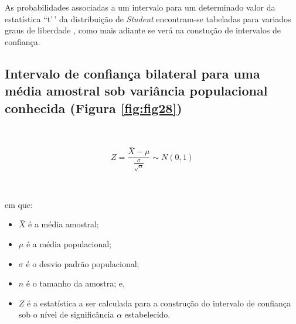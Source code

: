 \documentclass[
]{book}
\providecommand{\tightlist}{%
  \setlength{\itemsep}{0pt}\setlength{\parskip}{0pt}}
\begin{document}
\hfill\break

As probabilidades associadas a um intervalo para um determinado valor da estatística ``t'\,' da distribuição de \emph{Student} encontram-se tabeladas para variados graus de liberdade , como mais adiante se verá na constução de intervalos de confiança.

\hfill\break

\hypertarget{intervalo-de-confianuxe7a-bilateral-para-uma-muxe9dia-amostral-sob-variuxe2ncia-populacional-conhecida-figura-reffigfig28}{%
\subsection{Intervalo de confiança bilateral para uma média amostral sob variância populacional conhecida (Figura \ref{fig:fig28})}\label{intervalo-de-confianuxe7a-bilateral-para-uma-muxe9dia-amostral-sob-variuxe2ncia-populacional-conhecida-figura-reffigfig28}}

~

\[
Z = \frac{\stackrel{-}{X} - \mu}{\frac{\sigma}{\sqrt{n}}}  \sim N(0 ,1)
\]

~

em que:

\hfill\break

\begin{itemize}
\tightlist
\item
  \(\stackrel{-}{X}\) é a média amostral;\\
\item
  \(\mu\) é a média populacional;\\
\item
  \(\sigma\) é o desvio padrão populacional;
\item
  \(n\) é o tamanho da amostra; e,
\item
  \(Z\) é a estatística a ser calculada para a construção do intervalo de confiança sob o nível de significância \(\alpha\) estabelecido.
\end{itemize}

\hfill\break
\end{document}
